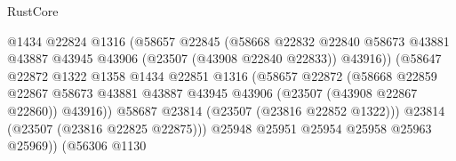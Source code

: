 \begin{lexlean}{RustCore}
\begin{coremodule}
                                            @1434
                                            @22824
                                            @1316
                                            (@58657
                                              @22845
                                              (@58668
                                                @22832
                                                @22840
                                                @58673
                                                @43881
                                                @43887
                                                @43945
                                                @43906
                                                (@23507 (@43908 @22840 @22833))
                                                @43916))
                                            (@58647
                                              @22872
                                              @1322
                                              @1358
                                              @1434
                                              @22851
                                              @1316
                                              (@58657
                                                @22872
                                                (@58668
                                                  @22859
                                                  @22867
                                                  @58673
                                                  @43881
                                                  @43887
                                                  @43945
                                                  @43906
                                                  (@23507 (@43908 @22867 @22860))
                                                  @43916))
                                              @58687
                                              @23814
                                              (@23507 (@23816 @22852 @1322)))
                                            @23814
                                            (@23507 (@23816 @22825 @22875)))
                                          @25948
                                          @25951
                                          @25954
                                          @25958
                                          @25963
                                          @25969))
                                      (@56306
                                        @1130

\end{coremodule}
\end{lexlean}
